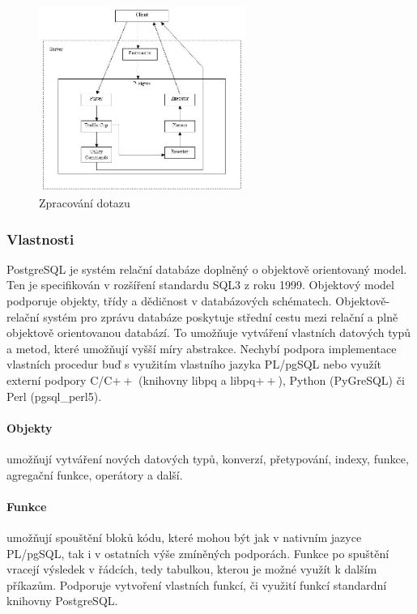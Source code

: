 \documentclass[a4paper,12pt,oneside]{report}
\begin{document}
  
\begin{figure}[h!]
    \centering
    \includegraphics[width=0.6\textwidth]{./img/implementace/postgremodel1.jpg}
    \caption[Dotaz PostgreSQL]{\centering  Zpracování dotazu \footnotemark}
 \end{figure} 
   \label{tab:dotaz}


\subsubsection{Vlastnosti}
PostgreSQL je systém relační databáze doplněný o objektově orientovaný
model. Ten je specifikován v rozšíření standardu SQL3 z roku
1999\cite{sql1999}. Objektový model podporuje objekty, třídy a
dědičnost v databázových schématech. Objektově-relační systém pro
zprávu databáze poskytuje střední cestu mezi relační a plně objektově
orientovanou databází. To umožňuje vytváření vlastních
datových typů a metod, které umožňují vyšší míry abstrakce. Nechybí
podpora implementace vlastních procedur buď s využitím vlastního
jazyka PL/pgSQL nebo využít externí podpory C/C$++$ (knihovny libpq a
libpq$++$), Python (PyGreSQL) či Perl (pgsql\_perl5).


\paragraph{Objekty} umožňují vytváření nových datových typů, konverzí,
přetypování, indexy, funkce, agregační funkce, operátory a další.

\paragraph*{Funkce} umožňují spouštění bloků kódu, které mohou být jak
v nativním jazyce PL/pgSQL, tak i v ostatních výše zmíněných
podporách. Funkce po spuštění vracejí výsledek v řádcích, tedy
tabulkou, kterou je možné využít k dalším příkazům. Podporuje
vytvoření vlastních funkcí, či využití funkcí  standardní knihovny
PostgreSQL.
\end{document}
